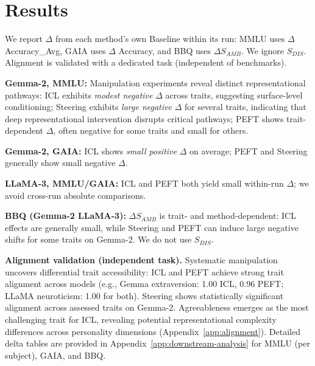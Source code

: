 \section{Results}

We report \(\Delta\) from each method's own Baseline within its run: MMLU uses \(\Delta\) Accuracy\_Avg, GAIA uses \(\Delta\) Accuracy, and BBQ uses \(\Delta S_{AMB}\). We ignore \(S_{DIS}\). Alignment is validated with a dedicated task (independent of benchmarks).

\textbf{Gemma-2, MMLU:} Manipulation experiments reveal distinct representational pathways: ICL exhibits \emph{modest negative} \(\Delta\) across traits, suggesting surface-level conditioning; Steering exhibits \emph{large negative} \(\Delta\) for several traits, indicating that deep representational intervention disrupts critical pathways; PEFT shows trait-dependent \(\Delta\), often negative for some traits and small for others.


\textbf{Gemma-2, GAIA:} ICL shows \emph{small positive} \(\Delta\) on average; PEFT and Steering generally show small negative \(\Delta\).


\textbf{LLaMA-3, MMLU/GAIA:} ICL and PEFT both yield small within-run \(\Delta\); we avoid cross-run absolute comparisons.


\textbf{BBQ (Gemma-2 \/ LLaMA-3):} \(\Delta S_{AMB}\) is trait- and method-dependent: ICL effects are generally small, while Steering and PEFT can induce large negative shifts for some traits on Gemma-2. We do not use \(S_{DIS}\).

\textbf{Alignment validation (independent task).} Systematic manipulation uncovers differential trait accessibility: ICL and PEFT achieve strong trait alignment across models (e.g., Gemma extraversion: 1.00 ICL, 0.96 PEFT; LLaMA neuroticism: 1.00 for both). Steering shows statistically significant alignment across assessed traits on Gemma-2. Agreeableness emerges as the most challenging trait for ICL, revealing potential representational complexity differences across personality dimensions (Appendix~\ref{app:alignment}). Detailed delta tables are provided in Appendix~\ref{app:downstream-analysis} for MMLU (per subject), GAIA, and BBQ.

